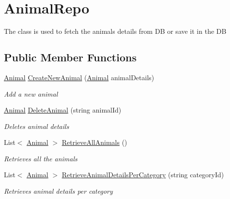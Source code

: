 \hypertarget{classWildLifeTracker_1_1Repository_1_1AnimalRepo}{}\section{Animal\+Repo}
\label{classWildLifeTracker_1_1Repository_1_1AnimalRepo}


The class is used to fetch the animals details from DB or save it in the DB  


\subsection*{Public Member Functions}
\begin{DoxyCompactItemize}
\item 
\hyperlink{classWildLifeTracker_1_1Models_1_1Animal}{Animal} \hyperlink{classWildLifeTracker_1_1Repository_1_1AnimalRepo_a8242d740e31fff58cf32f374c7d35672}{Create\+New\+Animal} (\hyperlink{classWildLifeTracker_1_1Models_1_1Animal}{Animal} animal\+Details)
\begin{DoxyCompactList}\small\item\em Add a new animal \end{DoxyCompactList}\item 
\hyperlink{classWildLifeTracker_1_1Models_1_1Animal}{Animal} \hyperlink{classWildLifeTracker_1_1Repository_1_1AnimalRepo_aaa8df32c561515cee5569a3bbf1d82d9}{Delete\+Animal} (string animal\+Id)
\begin{DoxyCompactList}\small\item\em Deletes animal details \end{DoxyCompactList}\item 
List$<$ \hyperlink{classWildLifeTracker_1_1Models_1_1Animal}{Animal} $>$ \hyperlink{classWildLifeTracker_1_1Repository_1_1AnimalRepo_a3acde68faeb372aa2cc1845f59e5e610}{Retrieve\+All\+Animals} ()
\begin{DoxyCompactList}\small\item\em Retrieves all the animals \end{DoxyCompactList}\item 
List$<$ \hyperlink{classWildLifeTracker_1_1Models_1_1Animal}{Animal} $>$ \hyperlink{classWildLifeTracker_1_1Repository_1_1AnimalRepo_a6a5e54dd241692cd249e470b225a3931}{Retrieve\+Animal\+Details\+Per\+Category} (string category\+Id)
\begin{DoxyCompactList}\small\item\em Retrieves animal details per category \end{DoxyCompactList}\item 

\end{DoxyCompactItemize}
